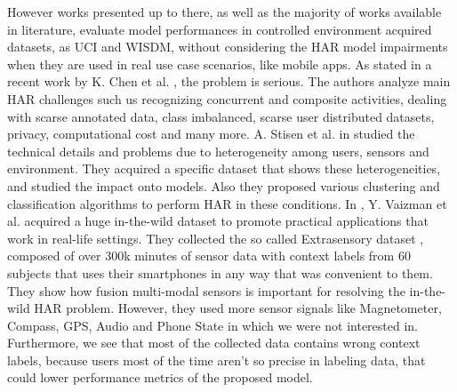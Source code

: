 However works presented up to there, as well as the majority of works
available in literature, evaluate model performances in controlled
environment acquired datasets, as UCI and WISDM, without considering
the HAR model impairments when they are used in real use case
scenarios, like mobile apps.  As stated in a recent work by K. Chen et
al. \cite{chen2020deep}, the problem is serious. The authors analyze
main HAR challenges such us recognizing concurrent and composite
activities, dealing with scarse annotated data, class imbalanced,
scarse user distributed datasets, privacy, computational cost and many
more.  A. Stisen et al. in \cite{stisen2015smart} studied the
technical details and problems due to heterogeneity among users,
sensors and environment. They acquired a specific dataset that shows
these heterogeneities, and studied the impact onto models. Also they
proposed various clustering and classification algorithms to perform
HAR in these conditions.  In \cite{vaizman2018extrasensory},
Y. Vaizman et al.  acquired a huge in-the-wild dataset to promote
practical applications that work in real-life settings. They collected
the so called Extrasensory dataset \cite{EXTRASENSORY}, composed of
over 300k minutes of sensor data with context labels from 60 subjects
that uses their smartphones in any way that was convenient to
them. They show how fusion multi-modal sensors is important for
resolving the in-the-wild HAR problem.  However, they used more sensor
signals like Magnetometer, Compass, GPS, Audio and Phone State in
which we were not interested in. Furthermore, we see that most of the
collected data contains wrong context labels, because users most of
the time aren't so precise in labeling data, that could lower
performance metrics of the proposed model.
